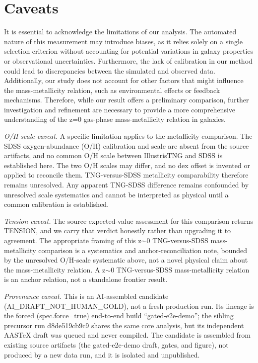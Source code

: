 \documentclass[twocolumn]{aastex631}
\begin{document}
\section{Caveats}
It is essential to acknowledge the limitations of our analysis. The automated nature of this measurement may introduce biases, as it relies solely on a single selection criterion without accounting for potential variations in galaxy properties or observational uncertainties. Furthermore, the lack of calibration in our method could lead to discrepancies between the simulated and observed data. Additionally, our study does not account for other factors that might influence the mass-metallicity relation, such as environmental effects or feedback mechanisms. Therefore, while our result offers a preliminary comparison, further investigation and refinement are necessary to provide a more comprehensive understanding of the z=0 gas-phase mass-metallicity relation in galaxies.

\emph{O/H-scale caveat.} A specific limitation applies to the metallicity comparison. The SDSS oxygen-abundance (O/H) calibration and scale are absent from the source artifacts, and no common O/H scale between IllustrisTNG and SDSS is established here. The two O/H scales may differ, and no dex offset is invented or applied to reconcile them. TNG-versus-SDSS metallicity comparability therefore remains unresolved. Any apparent TNG-SDSS difference remains confounded by unresolved scale systematics and cannot be interpreted as physical until a common calibration is established.

\emph{Tension caveat.} The source expected-value assessment for this comparison returns TENSION, and we carry that verdict honestly rather than upgrading it to agreement. The appropriate framing of this z$\sim$0 TNG-versus-SDSS mass-metallicity comparison is a systematics and anchor-reconciliation note, bounded by the unresolved O/H-scale systematic above, not a novel physical claim about the mass-metallicity relation. A z$\sim$0 TNG-versus-SDSS mass-metallicity relation is an anchor relation, not a standalone frontier result.

\emph{Provenance caveat.} This is an AI-assembled candidate (AI\_DRAFT\_NOT\_HUMAN\_GOLD), not a fresh production run. Its lineage is the forced (spec.force=true) end-to-end build ``gated-e2e-demo''; the sibling precursor run d8de519cb9c9 shares the same core analysis, but its independent AASTeX draft was queued and never compiled. The candidate is assembled from existing source artifacts (the gated-e2e-demo draft, gates, and figure), not produced by a new data run, and it is isolated and unpublished.
\end{document}
